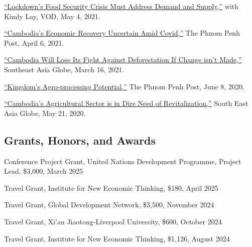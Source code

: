 \documentclass[10pt,a4paper]{article}
\begin{document}
	\href{https://vodenglish.news/opinion-lockdowns-food-security-crisis-must-address-demand-and-supply/}{``Lockdown's Food Security Crisis Must Address Demand and Supply,''} with Kimly Lay, VOD, May 4, 2021.\\ \vspace{-.5em}

	\href{https://www.phnompenhpost.com/opinion/cambodias-economic-recovery-uncertain-amid-covid}{``Cambodia's Economic Recovery Uncertain Amid Covid,''} The Phnom Penh Post, April 6, 2021.\\ \vspace{-.5em}

	\href{https://southeastasiaglobe.com/cambodia-deforestation-fight/}{``Cambodia Will Lose Its Fight Against Deforestation If Change isn't Made,''} Southeast Asia Globe, March 16, 2021.\\ \vspace{-.5em}

	\href{https://www.phnompenhpost.com/opinion/kingdoms-agro-processing-potential}{``Kingdom’s Agro-processing Potential,''} The Phnom Penh Post, June 8, 2020.\\  \vspace{-.5em}

	 \href{https://southeastasiaglobe.com/cambodias-agricultural-sector-is-one-in-dire-need-of-revitalising}{``Cambodia’s Agricultural Sector is in Dire Need of Revitalization,''} South East Asia Globe, May 21, 2020.

\subsection*{Grants, Honors, and Awards}

\parindent=0pt

Conference Project Grant, United Nations Development Programme, Project Lead, \$3,000, March 2025

Travel Grant, Institute for New Economic Thinking, \$180, April 2025

Travel Grant, Global Development Network, \$3,500, November 2024

Travel Grant, Xi'an Jiaotong-Liverpool University, \$600, October 2024

Travel Grant, Institute for New Economic Thinking, \$1,126, August 2024
\end{document}
